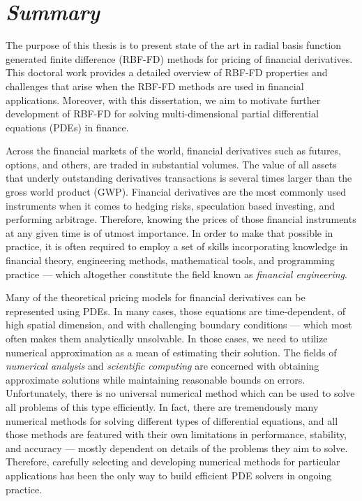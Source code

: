 \documentclass{UUThesisTemplate}
\begin{document}
\newpage
\chapter*{{{\sffamily\emph{Summary}}}}
{\noteunic

\par
The purpose of this thesis is to present state of the art in radial basis function generated finite difference (RBF-FD) methods for pricing of financial derivatives. This doctoral work provides a detailed overview of RBF-FD properties and challenges that arise when the RBF-FD methods are used in financial applications. Moreover, with this dissertation, we aim to motivate further development of RBF-FD for solving multi-dimensional partial differential equations (PDEs) in finance.

\par
Across the financial markets of the world, financial derivatives such as futures, options, and others, are traded in substantial volumes. The value of all assets that underly outstanding derivatives transactions is several times larger than the gross world product (GWP). Financial derivatives are the most commonly used instruments when it comes to hedging risks, speculation based investing, and performing arbitrage. Therefore, knowing the prices of those financial instruments at any given time is of utmost importance. In order to make that possible in practice, it is often required to employ a set of skills incorporating knowledge in financial theory, engineering methods, mathematical tools, and programming practice --- which altogether constitute the field known as \emph{financial engineering}. 

\par
Many of the theoretical pricing models for financial derivatives can be represented using PDEs. In many cases, those equations are time-dependent, of high spatial dimension, and with challenging boundary conditions --- which most often makes them analytically unsolvable. In those cases, we need to utilize numerical approximation as a mean of estimating their solution. The fields of \emph{numerical analysis} and \emph{scientific computing} are concerned with obtaining approximate solutions while maintaining reasonable bounds on errors. Unfortunately, there is no universal numerical method which can be used to solve all problems of this type efficiently. In fact, there are tremendously many numerical methods for solving different types of differential equations, and all those methods are featured with their own limitations in performance, stability, and accuracy --- mostly dependent on details of the problems they aim to solve. Therefore, carefully selecting and developing numerical methods for particular applications has been the only way to build efficient PDE solvers in ongoing practice. 

}
\end{document}
